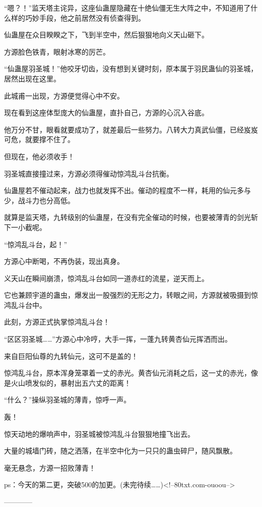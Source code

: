 \begin{this_body}
“嗯？！”监天塔主诧异，这座仙蛊屋隐藏在十绝仙僵无生大阵之中，不知道用了什么样的巧妙手段，他之前居然没有侦查得到。

仙蛊屋在众目睽睽之下，飞到半空中，然后狠狠地向义天山砸下。

方源脸色铁青，眼射冰寒的厉芒。

“仙蛊屋羽圣城！”他咬牙切齿，没有想到关键时刻，原本属于羽民蛊仙的羽圣城，居然出现在这里。

此城甫一出现，方源便觉得心中不安。

现在看到这座体型庞大的仙蛊屋，直扑自己，方源的心沉入谷底。

他万分不甘，眼看就要成功了，就差最后一些努力。八转大力真武仙僵，已经岌岌可危，就要撑不住了。

但现在，他必须收手！

羽圣城直接撞过来，方源必须得催动惊鸿乱斗台抗衡。

仙蛊屋若不催动起来，战力也就发挥不出。催动的程度不一样，耗用的仙元多与少，战斗力也分高低。

就算是监天塔，九转级别的仙蛊屋，在没有完全催动的时候，也要被薄青的剑光斩下一小截呢。

“惊鸿乱斗台，起！”

方源心中断喝，不再伪装，现出真身。

义天山在瞬间崩溃，惊鸿乱斗台如同一道赤红的流星，逆天而上。

它也兼顾宇道的蛊虫，爆发出一股强烈的无形之力，转眼之间，方源就被吸摄到惊鸿乱斗台中。

此刻，方源正式执掌惊鸿乱斗台！

“区区羽圣城……”方源心中冷哼，大手一挥，一蓬九转黄杏仙元挥洒而出。

来自巨阳仙尊的九转仙元，这可不是盖的！

惊鸿乱斗台，原本浑身笼罩着一丈的赤光。黄杏仙元消耗之后，这一丈的赤光，像是火山喷发似的，暴射出五六丈的距离！

“什么？”操纵羽圣城的薄青，惊呼一声。

轰！

惊天动地的爆响声中，羽圣城被惊鸿乱斗台狠狠地撞飞出去。

大量的城墙门砖，随之洒落，在半空中化为一只只的蛊虫碎尸，随风飘散。

毫无悬念，方源一招败薄青！

ps：今天的第二更，突破500的加更。(未完待续……)<!--80txt.com-ouoou-->

------------

\end{this_body}

